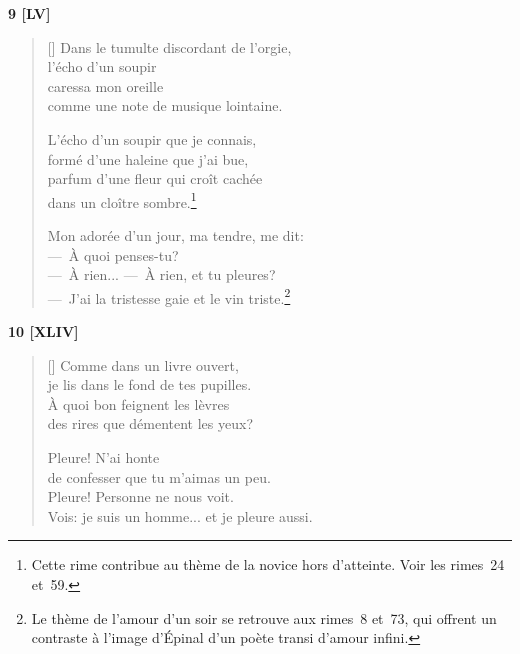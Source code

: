\documentclass[a4paper,12pt]{book}
\begin{document}
\bigskip

\begin{center}
  \textbf{9 [LV]}
\end{center}

\settowidth{\versewidth}{---~À rien... --~À rien, et tu pleures? --~J'ai la tristesse}

\begin{verse}[\versewidth]
  Dans le tumulte discordant de l'orgie, \\
  l'écho d'un soupir \\
  caressa mon oreille \\
  comme une note de musique lointaine.

  L'écho d'un soupir que je connais, \\
  formé d'une haleine que j'ai bue, \\
  parfum d'une fleur qui croît cachée \\
  dans un cloître sombre.\footnote{Cette rime contribue au thème de la
  novice hors d'atteinte. Voir les rimes~24 et~59.}

  Mon adorée d'un jour, ma tendre, me dit: \\
  ---~À quoi penses-tu? \\
  ---~À rien... ---~À rien, et tu pleures? \\
  ---~J'ai la tristesse gaie et le vin triste.\footnote{Le thème de l'amour d'un soir se
  retrouve aux rimes~8 et~73, qui offrent un contraste à l'image
  d'Épinal d'un poète transi d'amour infini.}
\end{verse}

\bigskip

\begin{center}
  \textbf{10 [XLIV]}
\end{center}

\settowidth{\versewidth}{Vois: je suis un homme... et je pleure aussi!}

\begin{verse}[\versewidth]
  Comme dans un livre ouvert, \\
  je lis dans le fond de tes pupilles. \\
  À quoi bon feignent les lèvres \\
  des rires que démentent les yeux?

  Pleure! N'ai honte \\
  de confesser que tu m'aimas un peu. \\
  Pleure! Personne ne nous voit. \\
  Vois: je suis un homme... et je pleure aussi.
\end{verse}
\end{document}
